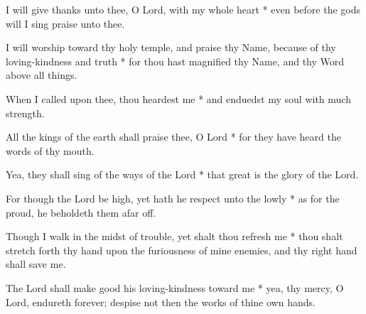 I will give thanks unto thee, O Lord, with my whole heart * even before the gods will I sing praise unto thee.

I will worship toward thy holy temple, and praise thy Name, because of thy loving-kindness and truth * for thou hast magnified thy Name, and thy Word above all things.
	
When I called upon thee, thou heardest me * and enduedst my soul with much strength.
	
All the kings of the earth shall praise thee, O Lord * for they have heard the words of thy mouth.
	
Yea, they shall sing of the ways of the Lord * that great is the glory of the Lord.
	
For though the Lord be high, yet hath he respect unto the lowly * as for the proud, he beholdeth them afar off.
	
Though I walk in the midst of trouble, yet shalt thou refresh me * thou shalt stretch forth thy hand upon the furiousness of mine enemies, and thy right hand shall save me.
	
The Lord shall make good his loving-kindness toward me * yea, thy mercy, O Lord, endureth forever; despise not then the works of thine own hands.